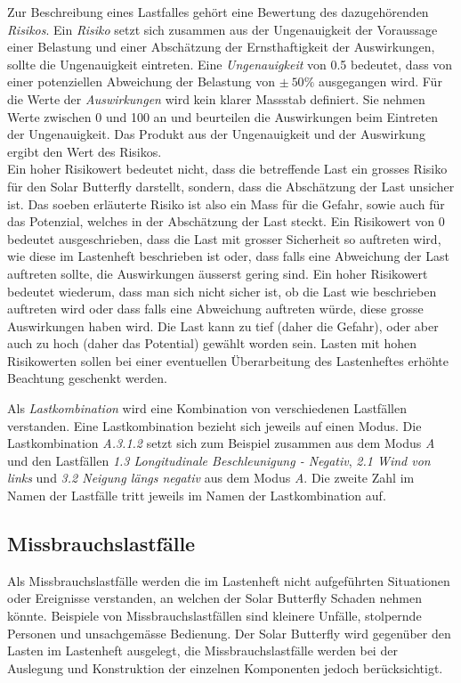 Zur Beschreibung eines Lastfalles gehört eine Bewertung des dazugehörenden \emph{Risikos}. Ein \emph{Risiko} setzt sich zusammen aus der Ungenauigkeit der Voraussage einer Belastung und einer Abschätzung der \glqq Ernsthaftigkeit\grqq{} der Auswirkungen, sollte die Ungenauigkeit eintreten. Eine \emph{Ungenauigkeit} von 0.5 bedeutet, dass von einer potenziellen Abweichung der Belastung von $\pm\: 50\%$ ausgegangen wird. Für die Werte der \emph{Auswirkungen} wird kein klarer Massstab definiert. Sie nehmen Werte zwischen 0 und 100 an und beurteilen die Auswirkungen beim Eintreten der Ungenauigkeit. Das Produkt aus der Ungenauigkeit und der Auswirkung ergibt den Wert des Risikos.\\
Ein hoher Risikowert bedeutet nicht, dass die betreffende Last ein grosses Risiko für den Solar Butterfly darstellt, sondern, dass die Abschätzung der Last unsicher ist. Das soeben erläuterte Risiko ist also ein Mass für die Gefahr, sowie auch für das Potenzial, welches in der Abschätzung der Last steckt. Ein Risikowert von 0 bedeutet ausgeschrieben, dass die Last mit grosser Sicherheit so auftreten wird, wie diese im Lastenheft beschrieben ist oder, dass falls eine Abweichung der Last auftreten sollte, die Auswirkungen äusserst gering sind. Ein hoher Risikowert bedeutet wiederum, dass man sich nicht sicher ist, ob die Last wie beschrieben auftreten wird oder dass falls eine Abweichung auftreten würde, diese grosse Auswirkungen haben wird. Die Last kann zu tief (daher die Gefahr), oder aber auch zu hoch (daher das Potential) gewählt worden sein. Lasten mit hohen Risikowerten sollen bei einer eventuellen Überarbeitung des Lastenheftes erhöhte Beachtung geschenkt werden.

Als \emph{Lastkombination} wird eine Kombination von verschiedenen Lastfällen verstanden. Eine Lastkombination bezieht sich jeweils auf einen Modus. Die Lastkombination \emph{A.3.1.2} setzt sich zum Beispiel zusammen aus dem Modus \emph{A} und den Lastfällen \emph{1.3 Longitudinale Beschleunigung - Negativ}, \emph{2.1 Wind von links} und \emph{3.2 Neigung längs negativ} aus dem Modus \emph{A}. Die zweite Zahl im Namen der Lastfälle tritt jeweils im Namen der Lastkombination auf.

\subsection{Missbrauchslastfälle}
Als Missbrauchslastfälle werden die im Lastenheft nicht aufgeführten Situationen oder Ereignisse verstanden, an welchen der Solar Butterfly Schaden nehmen könnte. Beispiele von Missbrauchslastfällen sind kleinere Unfälle, stolpernde Personen und unsachgemässe Bedienung. Der Solar Butterfly wird gegenüber den Lasten im Lastenheft ausgelegt, die Missbrauchslastfälle werden bei der Auslegung und Konstruktion der einzelnen Komponenten jedoch berücksichtigt.

